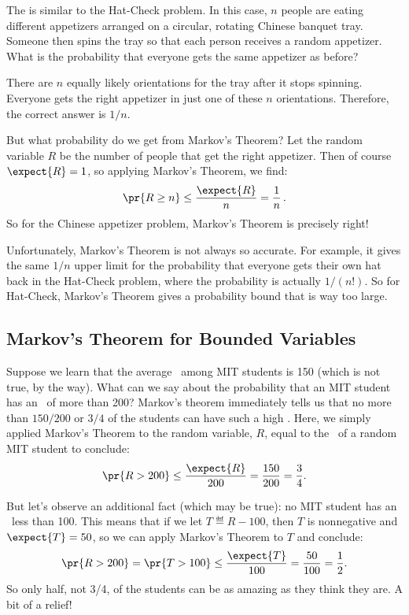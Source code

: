 The  is similar to the Hat-Check
problem.  In this case, $n$ people are eating different appetizers
arranged on a circular, rotating Chinese banquet tray.  Someone then
spins the tray so that each person receives a random appetizer.  What
is the probability that everyone gets the same appetizer as before?

There are $n$ equally likely orientations for the tray after it stops
spinning.  Everyone gets the right appetizer in just one of these $n$
orientations.  Therefore, the correct answer is $1/n$.

But what probability do we get from Markov's Theorem?  Let the random
variable $R$ be the number of people that get the right appetizer.  
Then of course $\expect{R} = 1$, so
applying Markov's Theorem, we find:
\begin{displaymath}
  \pr{R \geq n} \leq \frac{\expect{R}}{n} = \frac{1}{n}\,.
\end{displaymath}
So for the Chinese appetizer problem, Markov's Theorem is precisely
right!

Unfortunately, Markov's Theorem is not always so accurate.  For
example, it gives the same $1/n$ upper limit for the probability that
everyone gets their own hat back in the Hat-Check problem, where the
probability is actually $1/(n!)$.  So for Hat-Check, Markov's Theorem
gives a probability bound that is way too large.

\subsection{Markov's Theorem for Bounded Variables}

Suppose we learn that the average \IQ\ among MIT students is 150 (which is
not true, by the way).  What can we say about the probability that an MIT
student has an \IQ\ of more than 200?  Markov's theorem immediately tells
us that no more than $150/200$ or $3/4$ of the students can have such a
high \IQ.  Here, we simply applied Markov's Theorem to the random variable,
$R$, equal to the \IQ\ of a random MIT student to conclude:
\[
\pr{R > 200} \leq \frac{\expect{R}}{200}= \frac{150}{200} = \frac{3}{4}.
\]

But let's observe an additional fact (which may be true): no MIT student
has an \IQ\ less than 100.  This means that if we let $T \eqdef R-100$,
then $T$ is nonnegative and $\expect{T} = 50$, so we can apply Markov's
Theorem to $T$ and conclude:
\[
\pr{R > 200} = \pr{T > 100} \leq \frac{\expect{T}}{100}= \frac{50}{100} =
\frac{1}{2}.
\]
So only half, not 3/4, of the students can be as amazing as they think
they are.  A bit of a relief!

